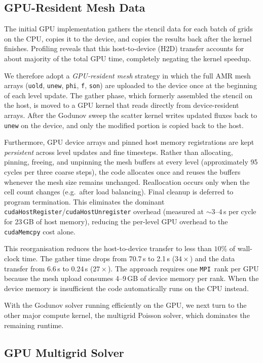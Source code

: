 \documentclass[fleqn,usenatbib]{mnras}
\newcommand{\code}[1]{\texttt{#1}}
\newcommand{\mpi}[0]{\texttt{MPI}}
\begin{document}
\subsection{GPU-Resident Mesh Data}
\label{sec:hybrid_gather}
The initial GPU implementation gathers the stencil data for each batch
of grids on the CPU, copies it to the device, and copies the results
back after the kernel finishes.  Profiling reveals that this
host-to-device (H2D) transfer accounts for about majority of the total
GPU time, completely negating the kernel speedup.

We therefore adopt a \emph{GPU-resident mesh} strategy in which the full AMR
mesh arrays (\code{uold}, \code{unew}, \code{phi}, \code{f},
\code{son}) are uploaded to the device once at the beginning of each
level update.  The gather phase, which formerly assembled the stencil
on the host, is moved to a GPU kernel that reads directly from
device-resident arrays.  After the Godunov sweep the scatter kernel
writes updated fluxes back to \code{unew} on the device, and only the
modified portion is copied back to the host.

Furthermore, GPU device arrays and pinned host memory registrations
are kept \emph{persistent} across level updates and fine timesteps.
Rather than allocating, pinning, freeing, and unpinning the mesh
buffers at every level (approximately 95 cycles per three coarse
steps), the code allocates once and reuses the buffers whenever the
mesh size remains unchanged.  Reallocation occurs only when the cell
count changes (e.g.\ after load balancing).  Final cleanup is deferred
to program termination.  This eliminates the dominant
\code{cudaHostRegister}/\code{cudaHostUnregister} overhead (measured at
${\sim}3$--$4$\,s per cycle for 23\,GB of host memory), reducing the
per-level GPU overhead to the \code{cudaMemcpy} cost alone.

This reorganisation reduces the host-to-device transfer to less than
$10\%$ of wall-clock time.  The gather time drops from 70.7\,s to
2.1\,s ($34\times$) and the data transfer from 6.6\,s to 0.24\,s
($27\times$).  The approach requires one \mpi\ rank per GPU because
the mesh upload consumes 4--9\,GB of device memory per rank.  When the
device memory is insufficient the code automatically runs on the CPU
instead.

With the Godunov solver running efficiently on the GPU, we next turn
to the other major compute kernel, the multigrid Poisson solver, which
dominates the remaining runtime.

\subsection{GPU Multigrid Solver}
\label{sec:hybrid_mg}
\end{document}
